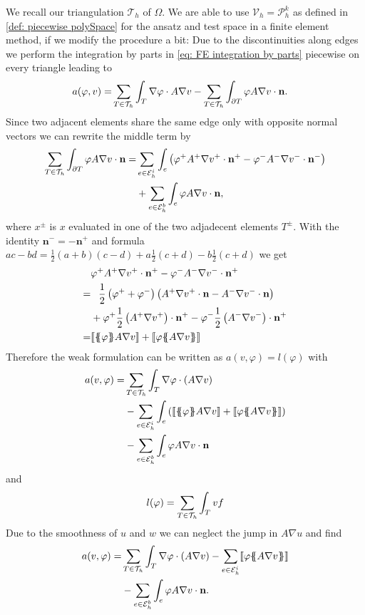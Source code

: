 We recall our triangulation $\mathcal{T}_h$ of $\Omega$. We are able to use $\mathcal V_h = \mathcal P_h^k$ as defined in \ref*{def: piecewise polySpace} for the ansatz and test space in a finite element method, if we modify the procedure a bit: Due to the discontinuities along edges we perform the integration by parts in \eqref{eq: FE integration by parts} piecewise on every triangle leading to
\begin{align}
	a(\varphi, v) = & \sum_{T \in \mathcal{T}_h} \int_T \nabla \varphi \cdot A \nabla v - \sum_{T \in \mathcal{T}_h} \int_{\partial T} \varphi A \nabla v \cdot \mathbf n.
\end{align}
Since two adjacent elements share the same edge only with opposite normal vectors we can rewrite the middle term by
\begin{align*}
\sum\limits_{T \in \mathcal{T}_h}\int_{\partial T} \varphi A \nabla v \cdot \mathbf n 
= &\sum\limits_{e \in \mathcal{E}_h^i}\int_{e} \left( \varphi^+ A^+ \nabla v^+ \cdot \mathbf n^+ - \varphi^- A^- \nabla v^- \cdot \mathbf n^- \right) \\
& + \sum\limits_{e \in \mathcal{E}_h^b}\int_{e} \varphi A \nabla v \cdot \mathbf n,
\end{align*}
where $x^\pm $ is $x$ evaluated in one of the two adjadecent elements $T^\pm$. With the identity $\mathbf n^- = -\mathbf n^+$ and formula $ac-bd = \frac 1 2 (a+b)(c-d) + a\frac 1 2(c+d)-b\frac 1 2(c+d)$  we get
\begin{align*}
	&\varphi^+ A^+ \nabla v^+ \cdot \mathbf n^+ - \varphi^- A^- \nabla v^- \cdot \mathbf n^+ \\
	= & \phantom{+} \frac 1 2 \left(\varphi^+ + \varphi^- \right) \left(A^+ \nabla v^+ \cdot \mathbf n - A^- \nabla v^- \cdot \mathbf n \right) \\
  &+  \varphi^+ \frac 1 2  \left(A^+ \nabla v^+\right) \cdot \mathbf n^+ - \varphi^- \frac 1 2 \left(A^- \nabla v^-\right) \cdot \mathbf n^+ \\
  = &  \jump {\average \varphi  A \nabla v}+ \jump {\varphi \average{ A \nabla v}}
\end{align*}
Therefore the weak formulation can be written as $a(v,\varphi) = l(\varphi)$ with 
\begin{align*}
  a(v, \varphi) = & \sum\limits_{T \in \triang} \int_T \nabla \varphi \cdot \left(A \nabla v\right) \\
	& - \sum\limits_{e \in \edgesi}\int_{e} \left( \jump {\average \varphi A \nabla v} + \jump {\varphi \average{ A \nabla v}} \right)\\
& - \sum\limits_{e \in \edgesb}\int_{e} \varphi A \nabla v \cdot \mathbf n
\end{align*}
and
\[
l(\varphi) = \sum_{T \in \mathcal{T}_h} \int_T v f
\]
Due to the smoothness of $u$ and $w$ we can neglect the jump in $A \nabla u$ and find
\begin{align*}
 a(v, \varphi) = & \sum\limits_{T \in \triang} \int_T \nabla \varphi \cdot \left(A \nabla v\right) %
	- \sum\limits_{e \in \edgesi}
	\jump{ \varphi \average{ A \nabla v}} %
	\\
& - \sum\limits_{e \in \edgesb}\int_{e} \varphi A \nabla v \cdot \mathbf n.
\end{align*}

